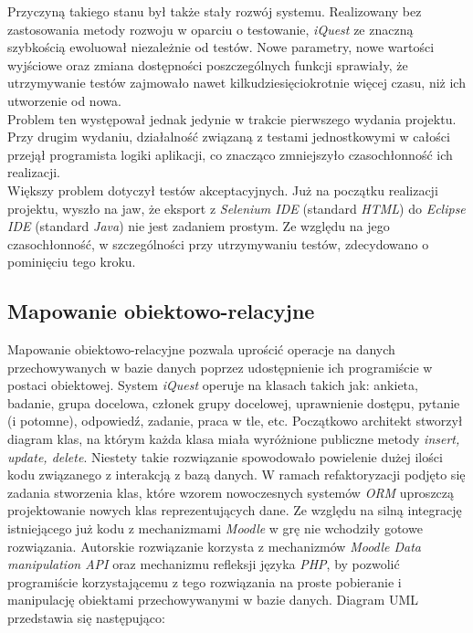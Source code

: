 Przyczyną takiego stanu był także stały rozwój systemu. Realizowany bez zastosowania metody rozwoju w oparciu o testowanie, \textit{iQuest} ze znaczną szybkością ewoluował niezależnie od testów. Nowe parametry, nowe wartości wyjściowe oraz zmiana dostępności poszczególnych funkcji sprawiały, że utrzymywanie testów zajmowało nawet kilkudziesięciokrotnie więcej czasu, niż ich utworzenie od nowa. \\

Problem ten występował jednak jedynie w trakcie pierwszego wydania projektu. Przy drugim wydaniu, działalność związaną z testami jednostkowymi w całości przejął programista logiki aplikacji, co znacząco zmniejszyło czasochłonność ich realizacji. \\

Większy problem dotyczył testów akceptacyjnych. Już na początku realizacji projektu, wyszło na jaw, że eksport z \textit{Selenium IDE} (standard \textit{HTML}) do \textit{Eclipse IDE} (standard \textit{Java}) nie jest zadaniem prostym. Ze względu na jego czasochłonność, w szczególności przy utrzymywaniu testów, zdecydowano o pominięciu tego kroku. \\

\subsection{Mapowanie obiektowo-relacyjne}
\label{Chapter62c}

Mapowanie obiektowo-relacyjne pozwala uprościć operacje na danych przechowywanych w bazie danych poprzez udostępnienie ich programiście w postaci obiektowej. System \textit{iQuest} operuje na klasach takich jak: ankieta, badanie, grupa docelowa, członek grupy docelowej, uprawnienie dostępu, pytanie (i potomne), odpowiedź, zadanie, praca w tle, etc. Początkowo architekt stworzył diagram klas, na którym każda klasa miała wyróżnione publiczne metody \textit{insert, update, delete}. Niestety takie rozwiązanie spowodowało powielenie dużej ilości kodu związanego z interakcją z bazą danych. W ramach refaktoryzacji podjęto się zadania stworzenia klas, które wzorem nowoczesnych systemów \textit{ORM} uproszczą projektowanie nowych klas reprezentujących dane. Ze względu na silną integrację istniejącego już kodu z mechanizmami \textit{Moodle} w grę nie wchodziły gotowe rozwiązania. Autorskie rozwiązanie korzysta z mechanizmów \textit{Moodle Data manipulation API} oraz mechanizmu refleksji języka \textit{PHP}, by pozwolić programiście korzystającemu z tego rozwiązania na proste pobieranie i manipulację obiektami przechowywanymi w bazie danych. Diagram UML przedstawia się następująco:

